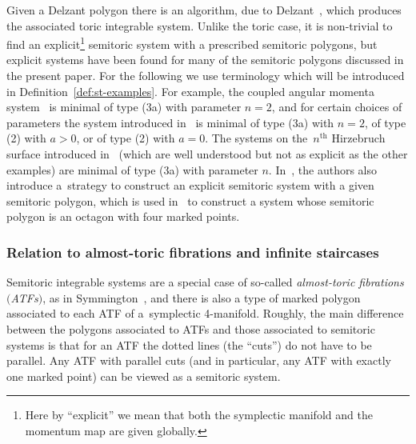 \documentclass[pdftex]{sigma}
\numberwithin{equation}{section}
\begin{document}
\begin{Remark}
 Given a Delzant polygon there is an algorithm, due to Delzant~\cite{De1988}, which produces the associated toric integrable system.
 Unlike the toric case, it is non-trivial to find an explicit\footnote{Here by ``explicit'' we mean that both the symplectic manifold and the momentum map are given globally.} semitoric system with a prescribed semitoric polygons, but explicit systems have been found for many of the semitoric polygons discussed in the present paper.
 For the following we use terminology which will be introduced in Definition~\ref{def:st-examples}.
 For example, the coupled angular momenta system~\cite{ADH-momenta,LFP,SaZh1999} is minimal of type (3a) with parameter $n=2$, and for certain choices of parameters the system introduced in~\cite{HoPa2017} is minimal of type (3a) with $n=2$, of type (2) with $a>0$, or of type (2) with $a=0$.
 The systems on the~$n^{\text{th}}$ Hirzebruch surface introduced in~\cite{LFPal} (which are well understood but not as explicit as the other examples) are minimal of type (3a) with parameter $n$. In~\cite{LFPal}, the authors also introduce a~strategy to construct an explicit semitoric system with a given semitoric polygon, which is used in~\cite{HohMeu} to construct a system whose semitoric polygon is an octagon with four marked points.
 \end{Remark}

\subsubsection{Relation to almost-toric fibrations and infinite staircases}
\label{sec:ATFs}

Semitoric integrable systems are a special case of so-called \emph{almost-toric fibrations $($ATFs$)$}, as in Symmington~\cite{Sy2003}, and there is also a type of marked polygon associated to each ATF of a~symplectic 4-manifold.
Roughly, the main difference between the polygons associated to ATFs and those associated to semitoric systems is that for an ATF the dotted lines (the ``cuts'') do not have to be parallel. Any ATF with parallel cuts (and in particular, any ATF with exactly one marked point) can be viewed as a semitoric system.
\end{document}
